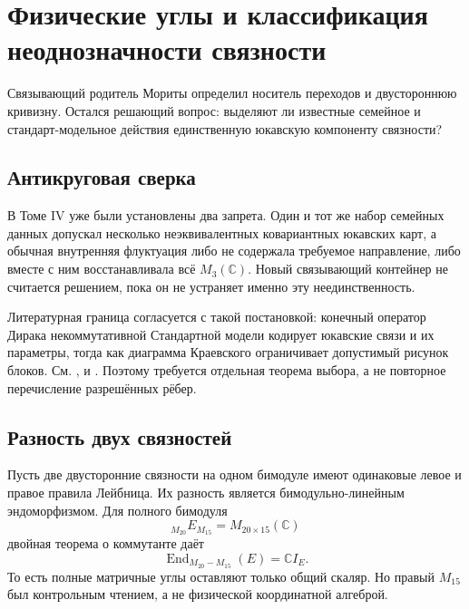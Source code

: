 \chapter{Физические углы и классификация неоднозначности связности}

Связывающий родитель Мориты определил носитель переходов и двустороннюю
кривизну. Остался решающий вопрос: выделяют ли известные семейное и
стандарт-модельное действия единственную юкавскую компоненту связности?

\section{Антикруговая сверка}

В Томе IV уже были установлены два запрета. Один и тот же набор семейных
данных допускал несколько неэквивалентных ковариантных юкавских карт, а
обычная внутренняя флуктуация либо не содержала требуемое направление,
либо вместе с ним восстанавливала всё $M_3(\mathbb C)$. Новый связывающий
контейнер не считается решением, пока он не устраняет именно эту
неединственность.

Литературная граница согласуется с такой постановкой: конечный оператор
Дирака некоммутативной Стандартной модели кодирует юкавские связи и их
параметры, тогда как диаграмма Краевского ограничивает допустимый рисунок
блоков. См. ,  и
. Поэтому требуется отдельная теорема выбора, а не
повторное перечисление разрешённых рёбер.

\section{Разность двух связностей}

Пусть две двусторонние связности на одном бимодуле имеют одинаковые левое
и правое правила Лейбница. Их разность является бимодульно-линейным
эндоморфизмом. Для полного бимодуля
\begin{equation}
 {}_{M_{20}}E_{M_{15}}=M_{20\times15}(\mathbb C)
\end{equation}
двойная теорема о коммутанте даёт
\begin{equation}
 \operatorname{End}_{M_{20}-M_{15}}(E)=\mathbb C I_E.
 \label{eq:v5-full-factor-connection-ambiguity}
\end{equation}
То есть полные матричные углы оставляют только общий скаляр. Но правый
$M_{15}$ был контрольным чтением, а не физической координатной алгеброй.

